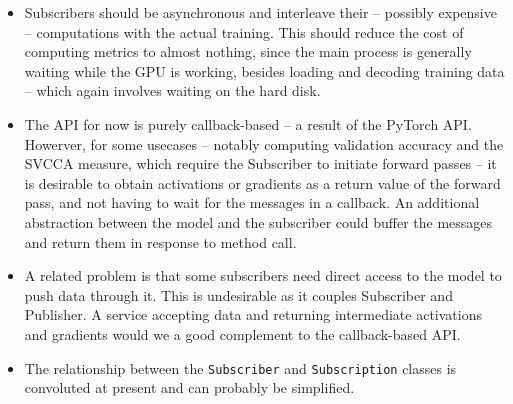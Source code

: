 \begin{itemize}
    \item Subscribers should be asynchronous and interleave their -- possibly
        expensive -- computations with the actual training. This should reduce
        the cost of computing metrics to almost nothing, since the main process
        is generally waiting while the GPU is working, besides loading and
        decoding training data -- which again involves waiting on the hard disk.
    \item The API for now is purely callback-based -- a result of the PyTorch
        API. Howerver, for some usecases -- notably computing validation
        accuracy and the SVCCA measure, which require the Subscriber to initiate
        forward passes -- it is desirable to obtain activations or gradients as
        a return value of the forward pass, and not having to wait for the
        messages in a callback. An additional abstraction between the model and
        the subscriber could buffer the messages and return them in response to
        method call.
    \item A related problem is that some subscribers need direct access to the
        model to push data through it. This is undesirable as it couples
        Subscriber and Publisher. A service accepting data and returning
        intermediate activations and gradients would we a good complement to the
        callback-based API.
    \item The relationship between the \texttt{Subscriber} and
        \texttt{Subscription} classes is convoluted at present and can probably
        be simplified.
\end{itemize}
